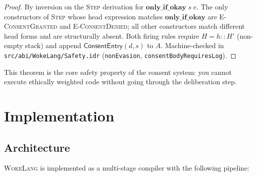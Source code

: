 \documentclass[11pt,a4paper]{article}
\newcommand{\WokeLang}{\textsc{WokeLang}}
\begin{document}
\begin{proof}
By inversion on the \textsc{Step} derivation for $\mathbf{only\_if\_okay}\;s\;e$.
The only constructors of \textsc{Step} whose head expression matches
$\mathbf{only\_if\_okay}$ are \textsc{E-ConsentGranted} and
\textsc{E-ConsentDenied}; all other constructors match different head
forms and are structurally absent.  Both firing rules require
$H = h :: H'$ (non-empty stack) and append
$\mathsf{ConsentEntry}(d, s)$ to $A$.
Machine-checked in \texttt{src/abi/WokeLang/Safety.idr}
(\texttt{nonEvasion}, \texttt{consentBodyRequiresLog}).
\end{proof}

This theorem is the core safety property of the consent system: you
cannot execute ethically weighted code without going through the
deliberation step.

\section{Implementation}
\label{sec:implementation}

\subsection{Architecture}

\WokeLang{} is implemented as a multi-stage compiler with the
following pipeline:
\end{document}
